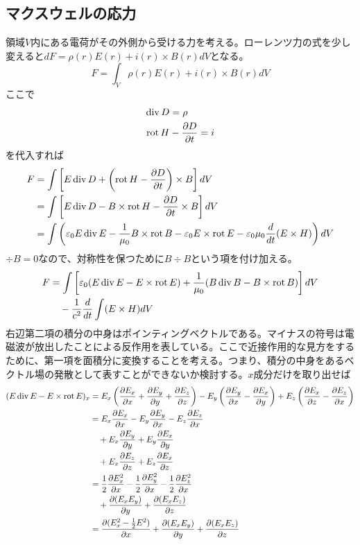 \subsection{マクスウェルの応力}
    領域$V$内にある電荷がその外側から受ける力を考える。ローレンツ力の式を少し変えると$dF = \rho(r)E(r) + i(r) \times B(r) dV$となる。
        \[F = \int_V \rho(r)E(r) + i(r)\times B(r)dV\]
    ここで
    \begin{align*}
        \div D &= \rho\\
        \rot H &- \pd[D]{t} = i
    \end{align*}
    を代入すれば
    \begin{align*}
        F   &= \int \left[E \div D + \left(\rot H - \pd[D]{t}\right) \times B\right] dV\\
            &= \int \left[E \div D - B \times \rot H - \pd[D]{t} \times B\right] dV\\
            &= \int \left(\epsilon_0E \div E - \frac{1}{\mu_0}B \times \rot B - \epsilon_0E \times \rot E - \epsilon_0\mu_0\de{t}(E \times H)\right) dV
    \end{align*}
    $\div B = 0$なので、対称性を保つために$B \div B$という項を付け加える。
    \begin{align*}
        F   &= \int \left[\epsilon_0(E \div E - E \times \rot E) + \frac{1}{\mu_0}(B \div B - B \times \rot B)\right] dV\\
            &\quad - \frac{1}{c^2}\de{t} \int (E \times H) dV
    \end{align*}
    右辺第二項の積分の中身はポインティングベクトルである。マイナスの符号は電磁波が放出したことによる反作用を表している。ここで近接作用的な見方をするために、第一項を面積分に変換することを考える。つまり、積分の中身をあるベクトル場の発散として表すことができないか検討する。$x$成分だけを取り出せば
    \begin{align*}
        (E\div E - E \times \rot E)_x
            &= E_x\left(\pd[E_x]{x} + \pd[E_y]{y} + \pd[E_z]{z}\right) - E_y\left(\pd[E_y]{x} - \pd[E_x]{y}\right) + E_z\left(\pd[E_x]{z} - \pd[E_z]{x}\right)\\
            &= E_x\pd[E_x]{x} - E_y\pd[E_y]{x} - E_z\pd[E_z]{x}\\
            &\quad + E_x\pd[E_y]{y} + E_y\pd[E_x]{y}\\
            &\quad + E_x\pd[E_z]{z} + E_z\pd[E_x]{z}\\
            &= \frac{1}{2}\pd[E_x^2]{x} - \frac{1}{2}\pd[E_y^2]{x} - \frac{1}{2}\pd[E_z^2]{x}\\
            &\quad + \pd[(E_xE_y)]{y} + \pd[(E_xE_z)]{z}\\
            &= \pd[(E_x^2 - \frac{1}{2}E^2)]{x} + \pd[(E_xE_y)]{y} + \pd[(E_xE_z)]{z}
    \end{align*}
